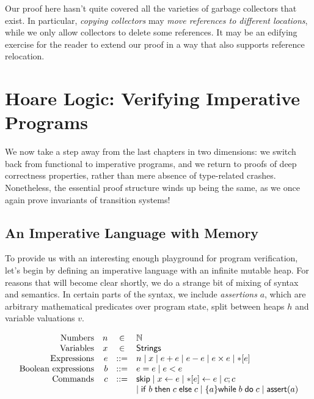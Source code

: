 \documentclass{amsbook}
\theoremstyle{definition}
\theoremstyle{remark}
\numberwithin{section}{chapter}
\numberwithin{equation}{chapter}
\begin{document}
Our proof here hasn't quite covered all the varieties of garbage collectors that exist.
In particular, \emph{copying collectors} may \emph{move references to different locations}, while we only allow collectors to delete some references.
It may be an edifying exercise for the reader to extend our proof in a way that also supports reference relocation.



\chapter{Hoare Logic: Verifying Imperative Programs}

We now take a step away from the last chapters in two dimensions: we switch back from functional to imperative programs, and we return to proofs of deep correctness properties, rather than mere absence of type-related crashes.
Nonetheless, the essential proof structure winds up being the same, as we once again prove invariants of transition systems!


\section{An Imperative Language with Memory}

\newcommand{\assert}[1]{\mathsf{assert}(#1)}
\newcommand{\readfrom}[1]{{*}[#1]}
\newcommand{\writeto}[2]{\readfrom{#1} \leftarrow #2}

To provide us with an interesting enough playground for program verification, let's begin by defining an imperative language with an infinite mutable heap.
For reasons that will become clear shortly, we do a strange bit of mixing of syntax and semantics.
In certain parts of the syntax, we include \emph{assertions} $a$, which are arbitrary mathematical predicates over program state, split between heaps $h$ and variable valuations $v$.

$$\begin{array}{rrcl}
  \textrm{Numbers} & n &\in& \mathbb N \\
  \textrm{Variables} & x &\in& \mathsf{Strings} \\
  \textrm{Expressions} & e &::=& n \mid x \mid e + e \mid e - e \mid e \times e \mid \readfrom{e} \\
  \textrm{Boolean expressions} & b &::=& e = e \mid e < e \\
  \textrm{Commands} & c &::=& \skipe \mid \assign{x}{e} \mid \writeto{e}{e} \mid c; c \\
  &&& \mid \ifte{b}{c}{c} \mid \{a\}\while{b}{c} \mid \assert{a}
\end{array}$$
\end{document}
